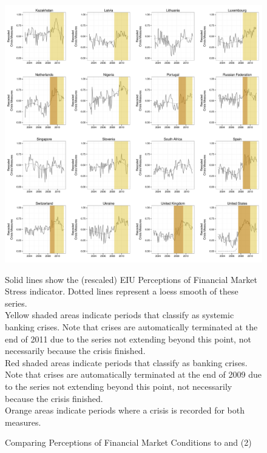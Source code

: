 \documentclass[]{article}
\begin{document}
\begin{figure}
    \caption{Comparing Perceptions of Financial Market Conditions to \cite{laeven2013} and \cite{Reinhart2009} (2)}
    \label{compare_2}
    \begin{center}
        \includegraphics[scale=0.4]{analysis/figures/compare_to_lv_rr_2.pdf}
    \end{center}

    {\tiny{Solid lines show the (rescaled) EIU Perceptions of Financial Market Stress indicator. Dotted lines represent a loess smooth of these series. \\

    Yellow shaded areas indicate periods that \cite{laeven2013} classify as systemic banking crises. Note that crises are automatically terminated at the end of 2011 due to the series not extending beyond this point, not necessarily because the crisis finished. \\

    Red shaded areas indicate periods that \cite{Reinhart2009} classify as banking crises. Note that crises are automatically terminated at the end of 2009 due to the series not extending beyond this point, not necessarily because the crisis finished. \\

    Orange areas indicate periods where a crisis is recorded for both measures.}}
\end{figure}
\end{document}
